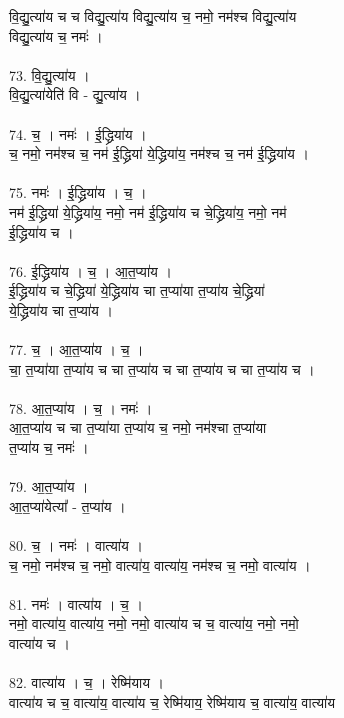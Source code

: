 वि॒द्यु॒त्या॑य च च विद्यु॒त्या॑य विद्यु॒त्या॑य च॒ नमो॒ नम॑श्च विद्यु॒त्या॑य\\
विद्यु॒त्या॑य च॒ नमः॑ ।\\
\\
73. वि॒द्यु॒त्या॑य ।\\
वि॒द्यु॒त्या॑येति॑ वि - द्यु॒त्या॑य ।\\
\\
74. च॒ । नमः॑ । ई॒द्ध्रिया॑य ।\\
च॒ नमो॒ नम॑श्च च॒ नम॑ ई॒द्ध्रिया॑ ये॒द्ध्रिया॑य॒ नम॑श्च च॒ नम॑ ई॒द्ध्रिया॑य ।\\
\\
75. नमः॑ । ई॒द्ध्रिया॑य । च॒ ।\\
नम॑ ई॒द्ध्रिया॑ ये॒द्ध्रिया॑य॒ नमो॒ नम॑ ई॒द्ध्रिया॑य च चे॒द्ध्रिया॑य॒ नमो॒ नम॑\\
ई॒द्ध्रिया॑य च ।\\
\\
76. ई॒द्ध्रिया॑य । च॒ । आ॒त॒प्या॑य ।\\
ई॒द्ध्रिया॑य च चे॒द्ध्रिया॑ ये॒द्ध्रिया॑य चा त॒प्या॑या त॒प्या॑य चे॒द्ध्रिया॑\\
ये॒द्ध्रिया॑य चा त॒प्या॑य ।\\
\\
77. च॒ । आ॒त॒प्या॑य । च॒ ।\\
चा॒ त॒प्या॑या त॒प्या॑य च चा त॒प्या॑य च चा त॒प्या॑य च चा त॒प्या॑य च ।\\
\\
78. आ॒त॒प्या॑य । च॒ । नमः॑ ।\\
आ॒त॒प्या॑य च चा त॒प्या॑या त॒प्या॑य च॒ नमो॒ नम॑श्चा त॒प्या॑या\\
त॒प्या॑य च॒ नमः॑ ।\\
\\
79. आ॒त॒प्या॑य ।\\
आ॒त॒प्या॑येत्या᳚ - त॒प्या॑य ।\\
\\
80. च॒ । नमः॑ । वात्या॑य ।\\
च॒ नमो॒ नम॑श्च च॒ नमो॒ वात्या॑य॒ वात्या॑य॒ नम॑श्च च॒ नमो॒ वात्या॑य ।\\
\\
81. नमः॑ । वात्या॑य । च॒ ।\\
नमो॒ वात्या॑य॒ वात्या॑य॒ नमो॒ नमो॒ वात्या॑य च च॒ वात्या॑य॒ नमो॒ नमो॒\\
वात्या॑य च ।\\
\\
82. वात्या॑य । च॒ । रेष्मि॑याय ।\\
वात्या॑य च च॒ वात्या॑य॒ वात्या॑य च॒ रेष्मि॑याय॒ रेष्मि॑याय च॒ वात्या॑य॒ वात्या॑य\\
